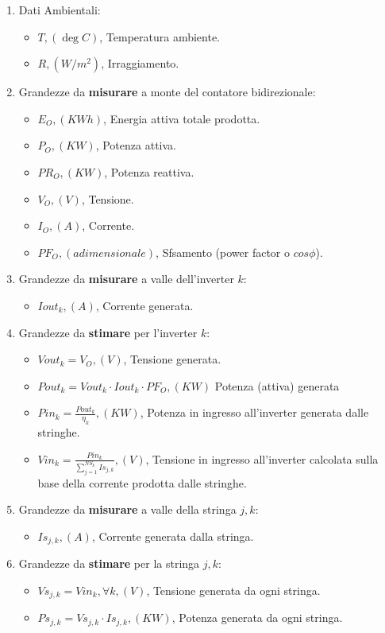 \begin{enumerate}
\item Dati Ambientali:
\begin{itemize}
\item $T, (\deg C)$, Temperatura ambiente.
\item $R, (W/m^2)$, Irraggiamento.
\end{itemize}
\item Grandezze da \textbf{misurare} a monte del contatore bidirezionale:
\begin{itemize}
\item$E_O, (KWh)$, Energia attiva totale prodotta.
\item$P_O, (KW)$, Potenza attiva.
\item$PR_O, (KW)$, Potenza reattiva.
\item$V_O, (V)$, Tensione.
\item$I_O, (A)$, Corrente.
\item$PF_O, (adimensionale)$, Sfsamento (power factor o $cos \phi$).
\end{itemize}
\item Grandezze da \textbf{misurare} a valle dell'inverter $k$:
\begin{itemize}
\item$Iout_{k}, (A)$, Corrente generata.
\end{itemize}
\item Grandezze da \textbf{stimare} per l'inverter $k$:
\begin{itemize}
\item$Vout_{k} = V_O, (V)$, Tensione generata.
\item$Pout_{k} = Vout_{k} \cdot Iout_{k}  \cdot PF_O, (KW)$ Potenza
  (attiva) generata
\item$Pin_{k} = \frac{Pout_k}{\eta _k}, (KW)$, Potenza in ingresso
  all'inverter generata dalle stringhe.
\item$Vin_{k} = \frac{Pin_k}{\sum_{j=1}^{NS_k}{Is_{j, k}}}, (V)$, Tensione
  in ingresso all'inverter
  calcolata sulla base della corrente prodotta dalle stringhe.
\end{itemize}
\item Grandezze da \textbf{misurare} a valle della stringa $j, k$:
\begin{itemize}
\item$Is_{j, k}, (A)$, Corrente generata dalla stringa.
\end{itemize}
\item Grandezze da \textbf{stimare} per la stringa $j, k$:
\begin{itemize}
\item$Vs_{j, k} = Vin_{k}, \forall k, (V)$, Tensione generata da ogni stringa.
\item$Ps_{j, k} = Vs_{j,k} \cdot Is_{j,k}, (KW)$, Potenza generata da ogni
  stringa.
\end{itemize}
\end{enumerate}
%

